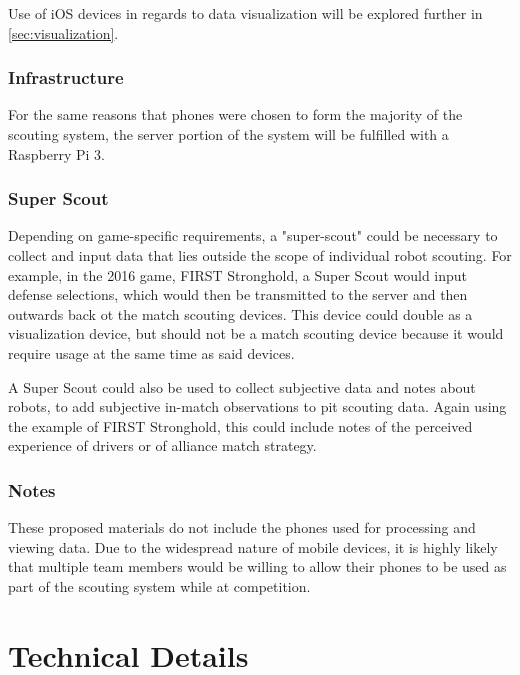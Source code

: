 \documentclass[11pt]{report}
\begin{document}
Use of iOS devices in regards to data visualization will be explored further in \autoref{sec:visualization}.

\subsection{Infrastructure}

For the same reasons that phones were chosen to form the majority of the scouting system, the server portion of the system will be fulfilled with a Raspberry Pi 3.

\subsection{Super Scout}

Depending on game-specific requirements, a "super-scout" could be necessary to collect and input data that lies outside the scope of individual robot scouting. For example, in the 2016 game, FIRST Stronghold, a Super Scout would input defense selections, which would then be transmitted to the server and then outwards back ot the match scouting devices. This device could double as a visualization device, but should not be a match scouting device because it would require usage at the same time as said devices.

A Super Scout could also be used to collect subjective data and notes about robots, to add subjective in-match observations to pit scouting data. Again using the example of FIRST Stronghold, this could include notes of the perceived experience of drivers or of alliance match strategy.

\subsection{Notes}

These proposed materials do not include the phones used for processing and viewing data. Due to the widespread nature of mobile devices, it is highly likely that multiple team members would be willing to allow their phones to be used as part of the scouting system while at competition.





\chapter{Technical Details}
\end{document}
